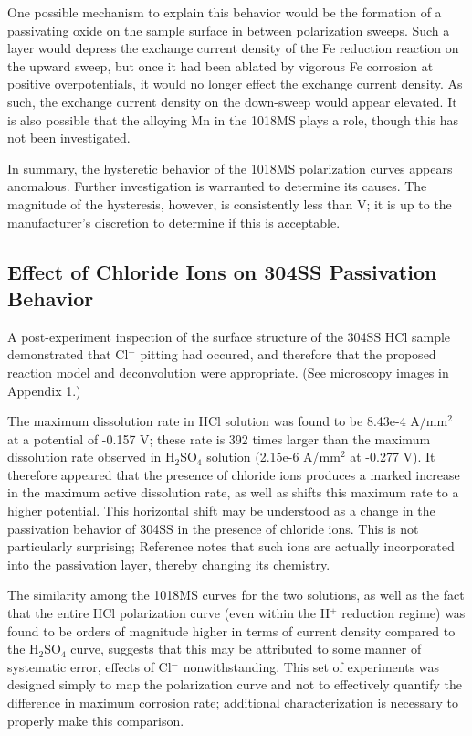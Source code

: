 One possible mechanism to explain this behavior would be the formation of a passivating oxide on the sample surface in between polarization sweeps.  Such a layer would depress the exchange current density of the Fe reduction reaction on the upward sweep, but once it had been ablated by vigorous Fe corrosion at positive overpotentials, it would no longer effect the exchange current density.  As such, the exchange current density on the down-sweep would appear elevated.  It is also possible that the alloying Mn in the 1018MS plays a role, though this has not been investigated.

In summary, the hysteretic behavior of the 1018MS polarization curves appears anomalous.  Further investigation is warranted to determine its causes.  The magnitude of the hysteresis, however, is consistently less than  V; it is up to the manufacturer's discretion to determine if this is acceptable.

\subsection{Effect of Chloride Ions on 304SS Passivation Behavior}

A post-experiment inspection of the surface structure of the 304SS HCl sample demonstrated that Cl$^-$ pitting had occured, and therefore that the proposed reaction model and deconvolution were appropriate.  (See microscopy images in Appendix 1.)

The maximum dissolution rate in HCl solution was found to be 8.43e-4 A/mm$^2$ at a potential of -0.157 V; these rate is 392 times larger than the maximum dissolution rate observed in H$_2$SO$_4$ solution (2.15e-6 A/mm$^2$ at -0.277 V).  It therefore appeared that the presence of chloride ions produces a marked increase in the maximum active dissolution rate, as well as shifts this maximum rate to a higher potential.  This horizontal shift may be understood as a change in the passivation behavior of 304SS in the presence of chloride ions.  This is not particularly surprising; Reference \cite{cllayer} notes that such ions are actually incorporated into the passivation layer, thereby changing its chemistry.

The similarity among the 1018MS curves for the two solutions, as well as the fact that the entire HCl polarization curve (even within the H$^+$ reduction regime) was found to be  orders of magnitude higher in terms of current density compared to the H$_2$SO$_4$ curve, suggests that this may be attributed to some manner of systematic error, effects of Cl$^-$ nonwithstanding.  This set of experiments was designed simply to map the polarization curve and not to effectively quantify the difference in maximum corrosion rate; additional characterization is necessary to properly make this comparison.

